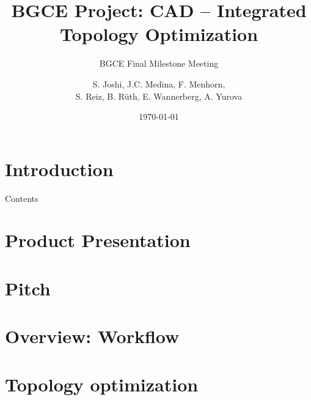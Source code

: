 \documentclass[9pt,pdftex]{beamer}
\title{BGCE Project: CAD -- Integrated Topology Optimization}
\subtitle{BGCE Final Milestone Meeting}
\author[S. Joshi, S. Reiz] {
S. Joshi, J.C. Medina, F. Menhorn, 
\\
S. Reiz, B. Rüth, E. Wannerberg, A. Yurova} %
\date{\today}
\institute{Technische Universität München}
\begin{document}
\frame{\maketitle}

\section*{Introduction}
\begin{frame}{Contents}
\tableofcontents
\end{frame}

\section{Product Presentation}


\section{Pitch}


\section{Overview: Workflow}


%


\section{Topology optimization}


%
\end{document}
